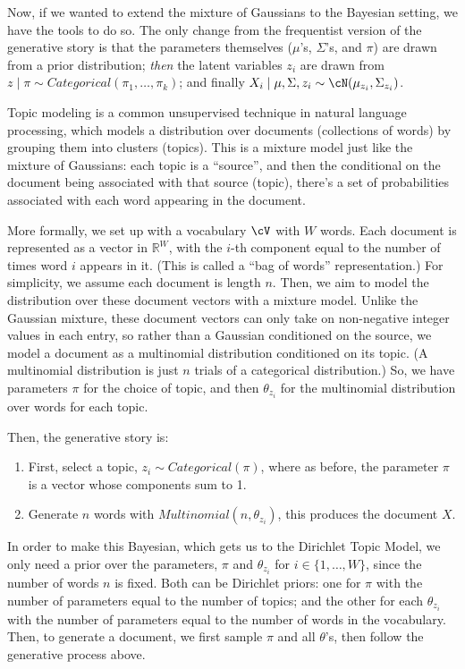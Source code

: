 Now, if we wanted to extend the mixture of Gaussians to the Bayesian setting, we have the tools to do so. The only change from the frequentist version of the generative story is that the parameters themselves ($\mu$'s, $\Sigma$'s, and $\pi$) are drawn from a prior distribution; \textit{then} the latent variables $z_i$ are drawn from $z \mid \pi \sim Categorical(\pi_1, \ldots, \pi_k)$; and finally $X_i \mid \mu, \Sigma, z_i \sim \cN(\mu_{z_i}, \Sigma_{z_i})$.

Topic modeling is a common unsupervised technique in natural language processing, which models a distribution over documents (collections of words) by grouping them into clusters (topics). This is a mixture model just like the mixture of Gaussians: each topic is a ``source'', and then the conditional on the document being associated with that source (topic), there's a set of probabilities associated with each word appearing in the document.

More formally, we set up with a vocabulary $\cV$ with $W$ words. Each document is represented as a vector in $\mathbb{R}^W$, with the $i$-th component equal to the number of times word $i$ appears in it. (This is called a ``bag of words'' representation.) For simplicity, we assume each document is length $n$. Then, we aim to model the distribution over these document vectors with a mixture model. Unlike the Gaussian mixture, these document vectors can only take on non-negative integer values in each entry, so rather than a Gaussian conditioned on the source, we model a document as a multinomial distribution conditioned on its topic. (A multinomial distribution is just $n$ trials of a categorical distribution.) So, we have parameters $\pi$ for the choice of topic, and then $\theta_{z_i}$ for the multinomial distribution over words for each topic.

Then, the generative story is:
\begin{enumerate}
\item First, select a topic, $z_i \sim Categorical(\pi)$, where as before, the parameter $\pi$ is a vector whose components sum to 1.
\item Generate $n$ words with $Multinomial(n, \theta_{z_i})$, this produces the document $X$.
\end{enumerate}

In order to make this Bayesian, which gets us to the Dirichlet Topic Model, we only need a prior over the parameters, $\pi$ and $\theta_{z_i}$ for $i \in \{1, \ldots, W\}$, since the number of words $n$ is fixed. Both can be Dirichlet priors: one for $\pi$ with the number of parameters equal to the number of topics; and the other for each $\theta_{z_i}$ with the number of parameters equal to the number of words in the vocabulary. Then, to generate a document, we first sample $\pi$ and all $\theta$'s, then follow the generative process above.

